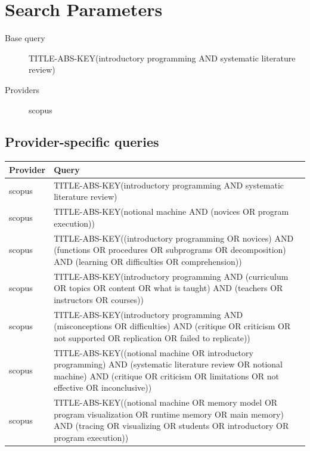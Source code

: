 \documentclass{article}
\begin{document}
\section{Search Parameters}

\begin{description}
\item[Base query] TITLE-ABS-KEY(\textquotedbl{}introductory programming\textquotedbl{} AND \textquotedbl{}systematic literature review\textquotedbl{})
\item[Providers] scopus
\end{description}

\subsection{Provider-specific queries}
\begin{longtable}{lp{10cm}}
\toprule
Provider & Query \\
\midrule
scopus & TITLE-ABS-KEY(\textquotedbl{}introductory programming\textquotedbl{} AND \textquotedbl{}systematic literature review\textquotedbl{}) \\
scopus & TITLE-ABS-KEY(\textquotedbl{}notional machine\textquotedbl{} AND (novices OR \textquotedbl{}program execution\textquotedbl{})) \\
scopus & TITLE-ABS-KEY((\textquotedbl{}introductory programming\textquotedbl{} OR novices) AND (functions OR procedures OR subprograms OR decomposition) AND (learning OR difficulties OR comprehension)) \\
scopus & TITLE-ABS-KEY(\textquotedbl{}introductory programming\textquotedbl{} AND (curriculum OR topics OR content OR \textquotedbl{}what is taught\textquotedbl{}) AND (teachers OR instructors OR courses)) \\
scopus & TITLE-ABS-KEY(\textquotedbl{}introductory programming\textquotedbl{} AND (misconceptions OR difficulties) AND (critique OR criticism OR \textquotedbl{}not supported\textquotedbl{} OR replication OR \textquotedbl{}failed to replicate\textquotedbl{})) \\
scopus & TITLE-ABS-KEY((\textquotedbl{}notional machine\textquotedbl{} OR \textquotedbl{}introductory programming\textquotedbl{}) AND (\textquotedbl{}systematic literature review\textquotedbl{} OR \textquotedbl{}notional machine\textquotedbl{}) AND (critique OR criticism OR limitations OR \textquotedbl{}not effective\textquotedbl{} OR inconclusive)) \\
scopus & TITLE-ABS-KEY((\textquotedbl{}notional machine\textquotedbl{} OR \textquotedbl{}memory model\textquotedbl{} OR \textquotedbl{}program visualization\textquotedbl{} OR \textquotedbl{}runtime memory\textquotedbl{} OR \textquotedbl{}main memory\textquotedbl{}) AND (tracing OR visualizing OR students OR introductory OR \textquotedbl{}program execution\textquotedbl{})) \\

\end{longtable}
\end{document}
